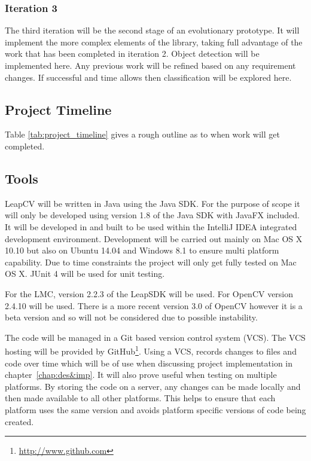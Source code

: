 \documentclass[11pt,oneside]{report}
\begin{document}
					\subsubsection{Iteration 3}
					The third iteration will be the second stage of an evolutionary prototype.
					It will implement the more complex elements of the library, taking full advantage of the work that has been completed in iteration 2.
					Object detection will be implemented here.
					Any previous work will be refined based on any requirement changes.
					If successful and time allows then classification will be explored here.
					\subsection{Project Timeline}
					Table \ref{tab:project_timeline} gives a rough outline as to when work will get completed.
					
			
			\subsection{Tools}
			LeapCV will be written in Java using the Java SDK.
			For the purpose of scope it will only be developed using version 1.8 of the Java SDK with JavaFX included.
			It will be developed in and built to be used within the IntelliJ IDEA integrated development environment.
			Development will be carried out mainly on Mac OS X 10.10 but also on Ubuntu 14.04 and Windows 8.1 to ensure multi platform capability.
			Due to time constraints the project will only get fully tested on Mac OS X.
			JUnit 4 will be used for unit testing.
			
			For the LMC, version 2.2.3 of the LeapSDK will be used.
			For OpenCV version 2.4.10 will be used.
			There is a more recent version 3.0 of OpenCV however it is a beta version and so will not be considered due to possible instability.
			
			The code will be managed in a Git based version control system (VCS).
			The VCS hosting will be provided by GitHub\footnote{\url{http://www.github.com}}.
			Using a VCS, records changes to files and code over time which will be of use when discussing project implementation in chapter~\ref{chap:des&imp}.
			It will also prove useful when testing on multiple platforms.
			By storing the code on a server, any changes can be made locally and then made available to all other platforms.
			This helps to ensure that each platform uses the same version and avoids platform specific versions of code being created.
\end{document}

